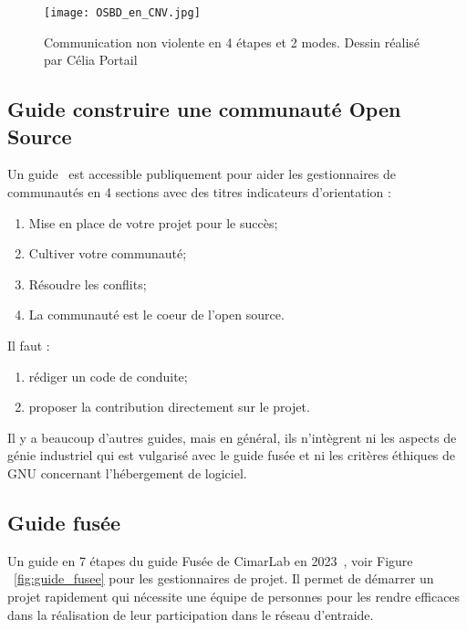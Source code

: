 \begin{figure}[htb]
\centering
\texttt{[image: OSBD\_en\_CNV.jpg]}
\caption{Communication non violente en 4 étapes et 2 modes. Dessin réalisé par Célia Portail~\cite{wikipedia_image_non_violente}}
\label{fig:communication_non_violente}
\end{figure}

\subsection{Guide construire une communauté Open Source}

Un guide~\cite{url_open_source_guide} est accessible publiquement pour aider les gestionnaires de communautés en 4 sections avec des titres indicateurs d’orientation :

\begin{enumerate}
    \item Mise en place de votre projet pour le succès;
    \item Cultiver votre communauté;
    \item Résoudre les conflits;
    \item La communauté est le coeur de l’open source.
\end{enumerate}

Il faut :
\begin{enumerate}
    \item rédiger un code de conduite;
    \item proposer la contribution directement sur le projet.
\end{enumerate}

Il y a beaucoup d'autres guides, mais en général, ils n'intègrent ni les aspects de génie industriel qui est vulgarisé avec le guide fusée et ni les critères éthiques de GNU concernant l’hébergement de logiciel.

\subsection{Guide fusée}

Un guide en 7 étapes du guide Fusée de CimarLab en 2023~\cite{guide_fusee}, voir Figure ~\ref{fig:guide_fusee} pour les gestionnaires de projet. Il permet de démarrer un projet rapidement qui nécessite une équipe de personnes pour les rendre efficaces dans la réalisation de leur participation dans le réseau d’entraide.

